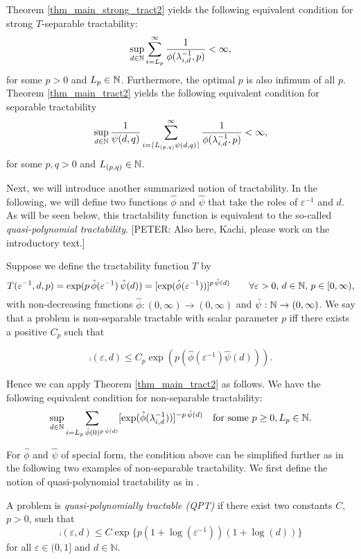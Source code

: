 \documentclass[sort&compress]{elsarticle}
\newcommand{\peter}[1]{\begingroup\color{purple}#1\endgroup}
\newcommand{\kachi}[1]{\begingroup\color{ForestGreen}#1\endgroup}
\begin{document}
\begin{example}
Theorem \ref{thm_main_strong_tract2} yields the following equivalent condition for strong $T$-separable tractability:
\begin{equation*} \label{eq:strong_tractiff}
     \sup_{d \in \mathbb{N}} \sum_{i = L_p}^\infty \frac{1}{\phi(\lambda_{i, d}^{-1},p)} < \infty,
\end{equation*}
for some $p>0$ and $L_p \in \mathbb{N}$. Furthermore, the optimal $p$ is also infimum of all $p$.
Theorem \ref{thm_main_tract2} yields the following equivalent condition for 
separable tractability
\[
 \sup_{d \in \mathbb{N}} \frac{1}{\psi(d,q)} \sum_{i = \lceil L_{(p,q)}\psi(d,q)\rceil}^\infty \frac{1}{\phi(\lambda_{i, d}^{-1},p)} < \infty,
\] for some $p,q >0$ and $L_{(p,q)}\in\mathbb{N}$.
\end{example}
\kachi{Next, we will introduce another summarized notion of tractability. In the following, we will define two functions $\hat{\phi}$ and $\hat{\psi}$ that take the roles of $\varepsilon^{-1}$ and $d$. As will be seen below, this tractability function is equivalent to the so-called \emph{quasi-polynomial tractability}.}
\peter{[PETER: Also here, Kachi, please work on the introductory text.]}
\begin{example}
    Suppose we define the tractability function $T$ by 
\[
 T(\varepsilon^{-1},d,p)= \exp (p \, \hat{\phi}(\varepsilon^{-1})\, \hat{\psi}(d)) = [\exp( \hat{\phi}(\varepsilon^{-1}))]^{p \, \hat{\psi}(d)}
 \qquad \forall \varepsilon > 0, \,  d \in \mathbb{N}, \, p\in [0,\infty),
\]  with non-decreasing functions $\hat{\phi} : (0,\infty) \to (0,\infty)$ and $\hat{\psi} : \mathbb{N} \to (0,\infty)$. 
We say that a problem is non-separable tractable with \peter{scalar} parameter $p$ iff there exists a positive $C_{p}$ such that

\[\comp(\varepsilon,d) 
\leq  C_{p}\exp (p(\hat{\phi}(\varepsilon^{-1})\hat{\psi}(d))).\]

Hence we can apply Theorem \ref{thm_main_tract2} as follows. We have the following equivalent condition for non-separable tractability:
\[
\sup_{d\in\mathbb{N}}\sum_{i=L_p\,\hat{\phi}(0)^{p \, \hat{\psi}(d)}} [\exp ( \hat{\phi}(\lambda_{i,d}^{-1}))]^{-p \, \hat{\psi}(d)}\quad \text{for some } p \geq 0, L_p \in \mathbb{N}.
\]

\end{example}
For $\hat{\phi}$ and $\hat{\psi}$ of special form, the condition above can be simplified further as in the following two examples of non-separable tractability. 
\kachi{We first define the notion of quasi-polynomial tractability as in \cite{GneWoz11a}.
\begin{definition}
     A problem is \emph{quasi-polynomially tractable (QPT)} if there exist two constants $C$, $p > 0$, such that
\begin{equation}\label{expqpt}
    \comp(\varepsilon,d) \leq C\exp\{p(1+\log(\varepsilon^{-1}))(1+\log(d))\}
\end{equation}
for all $\varepsilon \in (0,1]$ and $d\in\mathbb{N}$.
\end{definition}}
\end{document}
